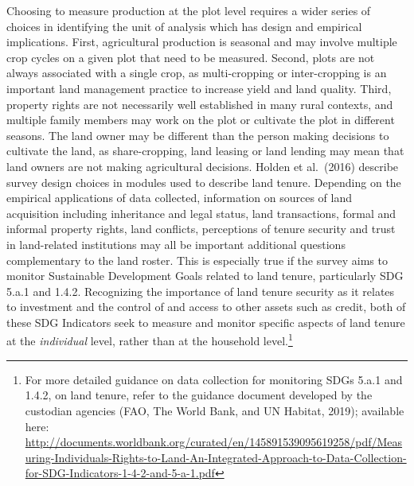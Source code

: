 \documentclass[
]{book}
\begin{document}
Choosing to measure production at the plot level requires a wider series of choices in identifying the unit of analysis which has design and empirical implications. First, agricultural production is seasonal and may involve multiple crop cycles on a given plot that need to be measured. Second, plots are not always associated with a single crop, as multi-cropping or inter-cropping is an important land management practice to increase yield and land quality. Third, property rights are not necessarily well established in many rural contexts, and multiple family members may work on the plot or cultivate the plot in different seasons. The land owner may be different than the person making decisions to cultivate the land, as share-cropping, land leasing or land lending may mean that land owners are not making agricultural decisions. Holden et al.~(2016) describe survey design choices in modules used to describe land tenure. Depending on the empirical applications of data collected, information on sources of land acquisition including inheritance and legal status, land transactions, formal and informal property rights, land conflicts, perceptions of tenure security and trust in land-related institutions may all be important additional questions complementary to the land roster. This is especially true if the survey aims to monitor Sustainable Development Goals related to land tenure, particularly SDG 5.a.1 and 1.4.2. Recognizing the importance of land tenure security as it relates to investment and the control of and access to other assets such as credit, both of these SDG Indicators seek to measure and monitor specific aspects of land tenure at the \emph{individual} level, rather than at the household level.\footnote{For more detailed guidance on data collection for monitoring SDGs 5.a.1 and 1.4.2, on land tenure, refer to the guidance document developed by the custodian agencies (FAO, The World Bank, and UN Habitat, 2019); available here: \url{http://documents.worldbank.org/curated/en/145891539095619258/pdf/Measuring-Individuals-Rights-to-Land-An-Integrated-Approach-to-Data-Collection-for-SDG-Indicators-1-4-2-and-5-a-1.pdf}}
\end{document}
